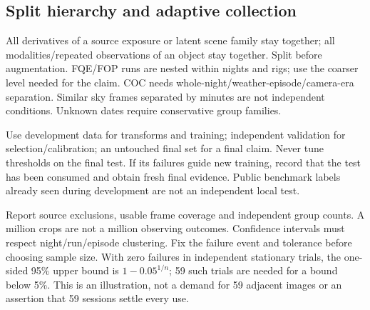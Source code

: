 \documentclass[11pt,a4paper]{article}
\begin{document}
\subsection{Split hierarchy and adaptive collection}
All derivatives of a source exposure or latent scene family stay together;
all modalities/repeated observations of an object stay together. Split before
augmentation. FQE/FOP runs are nested within nights and rigs; use the coarser
level needed for the claim. COC needs whole-night/weather-episode/camera-era
separation. Similar sky frames separated by minutes are not independent
conditions. Unknown dates require conservative group families.

Use development data for transforms and training; independent validation for
selection/calibration; an untouched final set for a final claim. Never tune
thresholds on the final test. If its failures guide new training, record that
the test has been consumed and obtain fresh final evidence. Public benchmark
labels already seen during development are not an independent local test.

Report source exclusions, usable frame coverage and independent group counts.
A million crops are not a million observing outcomes. Confidence intervals
must respect night/run/episode clustering. Fix the failure event and tolerance
before choosing sample size. With zero failures in independent stationary
trials, the one-sided 95\% upper bound is $1-0.05^{1/n}$; 59 such trials are
needed for a bound below 5\%. This is an illustration, not a demand for 59
adjacent images or an assertion that 59 sessions settle every use.
\end{document}
